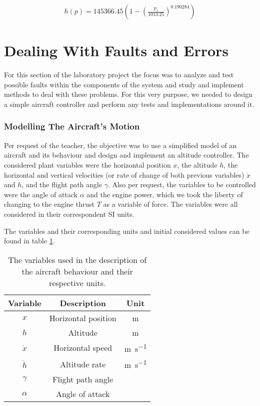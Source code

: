 \documentclass[english,palatino]{ist-report}
\begin{document}
\begin{gather*}
	h(p) = 145366.45\left(1 - \left(\frac{p_s}{1013.25}\right)^{0.190284}\right)
\end{gather*}

\pagebreak
\part{Dealing With Faults and Errors}

For this section of the laboratory project the focus was to analyze and test possible faults within the components of the system and study and implement methods to deal with these problems. For this very purpose, we needed to design a simple aircraft controller and perform any tests and implementations around it.

\section{Modelling The Aircraft's Motion}

Per request of the teacher, the objective was to use a simplified model of an aircraft and its behaviour and design and implement an altitude controller. The considered plant variables were the horizontal position $x$, the altitude $h$, the horizontal and vertical velocities (or rate of change of both previous variables) $\dot{x}$ and $\dot{h}$, and the flight path angle $\gamma$. Also per request, the variables to be controlled were the angle of attack $\alpha$ and the engine power, which we took the liberty of changing to the engine thrust $T$ as a variable of force. The variables were all considered in their correspondent SI units.

The variables and their corresponding units and initial considered values can be found in table \ref{tab:controllervars}.
\begin{table}[ht]
	\centering
	\begin{tabular}{c|c|c}\toprule
		Variable		& Description			& Unit						\\
		\midrule
		$x$				& Horizontal position	& \si{\meter}				\\
		$h$				& Altitude				& \si{\meter}				\\
		$\dot{x}$		& Horizontal speed		& \si{\meter\per\second}	\\
		$\dot{h}$		& Altitude rate			& \si{\meter\per\second}	\\
		$\gamma$		& Flight path angle		& 							\\
		$\alpha$		& Angle of attack		& 							\\
		\bottomrule
	\end{tabular}
	\caption{The variables used in the description of the aircraft behaviour and their respective units.}
	\label{tab:controllervars}
\end{table}
\end{document}
